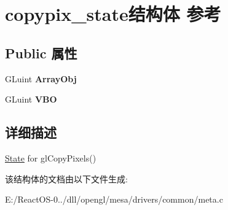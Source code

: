 \hypertarget{structcopypix__state}{}\section{copypix\+\_\+state结构体 参考}
\label{structcopypix__state}
\subsection*{Public 属性}
\begin{DoxyCompactItemize}
\item 
\mbox{\label{structcopypix__state_a92534f84e71e3574a494a38b14c4a294}} 
G\+Luint {\bfseries Array\+Obj}
\item 
\mbox{\label{structcopypix__state_aa7a4aca67c88d4d6d67d69c911f8c060}} 
G\+Luint {\bfseries V\+BO}
\end{DoxyCompactItemize}


\subsection{详细描述}
\hyperlink{struct_state}{State} for gl\+Copy\+Pixels() 

该结构体的文档由以下文件生成\+:\begin{DoxyCompactItemize}
\item 
E\+:/\+React\+O\+S-\/0../dll/opengl/mesa/drivers/common/meta.\+c\end{DoxyCompactItemize}
